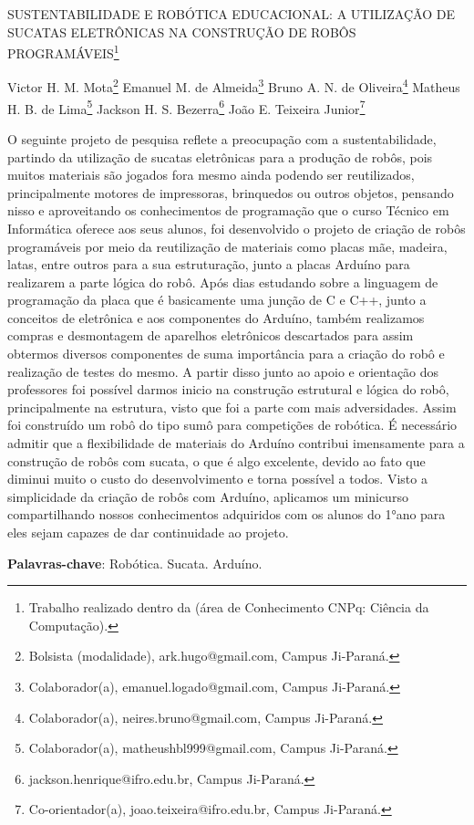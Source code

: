 \documentclass[article,12pt,onesidea,4paper,english,brazil]{abntex2}
\begin{document}
	
	
	\frenchspacing 
	
	\begin{center}
		\LARGE SUSTENTABILIDADE E ROBÓTICA EDUCACIONAL: A UTILIZAÇÃO DE
		SUCATAS ELETRÔNICAS NA CONSTRUÇÃO DE ROBÔS PROGRAMÁVEIS\footnote{Trabalho realizado dentro da (área de Conhecimento CNPq: Ciência da Computação).}
		
		\normalsize
	Victor H. M. Mota\footnote{Bolsista (modalidade), ark.hugo@gmail.com, Campus Ji-Paraná.} 
	Emanuel M. de Almeida\footnote{Colaborador(a), emanuel.logado@gmail.com, Campus Ji-Paraná.} 
	Bruno A. N. de Oliveira\footnote{Colaborador(a), neires.bruno@gmail.com, Campus Ji-Paraná.} 
	Matheus H. B. de Lima\footnote{Colaborador(a), matheushbl999@gmail.com, Campus Ji-Paraná.} 
	Jackson H. S. Bezerra\footnote{jackson.henrique@ifro.edu.br, Campus Ji-Paraná.}
	João E. Teixeira Junior\footnote{Co-orientador(a), joao.teixeira@ifro.edu.br, Campus Ji-Paraná.}
	\end{center}
	
	\noindent O seguinte projeto de pesquisa reflete a preocupação com a
	sustentabilidade, partindo da utilização de sucatas eletrônicas para a produção de
	robôs, pois muitos materiais são jogados fora mesmo ainda podendo ser
	reutilizados, principalmente motores de impressoras, brinquedos ou outros objetos,
	pensando nisso e aproveitando os conhecimentos de programação que o curso
	Técnico em Informática oferece aos seus alunos, foi desenvolvido o projeto de
	criação de robôs programáveis por meio da reutilização de materiais como placas
	mãe, madeira, latas, entre outros para a sua estruturação, junto a placas Arduíno
	para realizarem a parte lógica do robô. Após dias estudando sobre a linguagem de
	programação da placa que é basicamente uma junção de C e C++, junto a conceitos
	de eletrônica e aos componentes do Arduíno, também realizamos compras e
	desmontagem de aparelhos eletrônicos descartados para assim obtermos diversos
	componentes de suma importância para a criação do robô e realização de testes do
	mesmo. A partir disso junto ao apoio e orientação dos professores foi possível
	darmos inicio na construção estrutural e lógica do robô, principalmente na estrutura,
	visto que foi a parte com mais adversidades. Assim foi construído um robô do tipo
	sumô para competições de robótica. É necessário admitir que a flexibilidade de
	materiais do Arduíno contribui imensamente para a construção de robôs com sucata,
	o que é algo excelente, devido ao fato que diminui muito o custo do desenvolvimento
	e torna possível a todos. Visto a simplicidade da criação de robôs com Arduíno,
	aplicamos um minicurso compartilhando nossos conhecimentos adquiridos com os
	alunos do 1°ano para eles sejam capazes de dar continuidade ao projeto.
	
	\vspace{\onelineskip}
	
	\noindent
	\textbf{Palavras-chave}: Robótica. Sucata. Arduíno.
	
\end{document}
